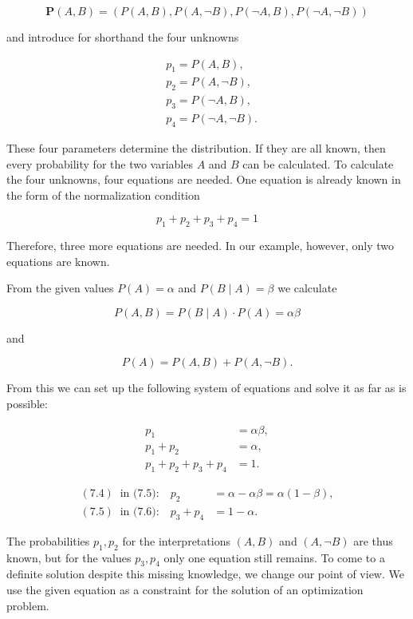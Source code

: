 \documentclass[10pt]{book}
\begin{document}
\[
\boldsymbol{P}(A, B)=(P(A, B), P(A, \neg B), P(\neg A, B), P(\neg A, \neg B))
\]

and introduce for shorthand the four unknowns

\[
\begin{aligned}
& p_{1}=P(A, B), \\
& p_{2}=P(A, \neg B), \\
& p_{3}=P(\neg A, B), \\
& p_{4}=P(\neg A, \neg B) .
\end{aligned}
\]

These four parameters determine the distribution. If they are all known, then every probability for the two variables $A$ and $B$ can be calculated. To calculate the four unknowns, four equations are needed. One equation is already known in the form of the normalization condition

\[
p_{1}+p_{2}+p_{3}+p_{4}=1
\]

Therefore, three more equations are needed. In our example, however, only two equations are known.

From the given values $P(A)=\alpha$ and $P(B \mid A)=\beta$ we calculate

\[
P(A, B)=P(B \mid A) \cdot P(A)=\alpha \beta
\]

and

\[
P(A)=P(A, B)+P(A, \neg B) .
\]

From this we can set up the following system of equations and solve it as far as is possible:

\begin{align*}
p_{1} & =\alpha \beta,  \tag{7.4}\\
p_{1}+p_{2} & =\alpha,  \tag{7.5}\\
p_{1}+p_{2}+p_{3}+p_{4} & =1. \tag{7.6}
\end{align*}

\begin{align*}
(7.4)\ \text{ in (7.5):}\quad p_{2} &= \alpha-\alpha \beta=\alpha(1-\beta), \tag{7.7}\\
(7.5)\ \text{ in (7.6):}\quad p_{3}+p_{4} &= 1-\alpha. \tag{7.8}
\end{align*}

The probabilities $p_{1}, p_{2}$ for the interpretations $(A, B)$ and $(A, \neg B)$ are thus known, but for the values $p_{3}, p_{4}$ only one equation still remains. To come to a definite solution despite this missing knowledge, we change our point of view. We use the given equation as a constraint for the solution of an optimization problem.
\end{document}
